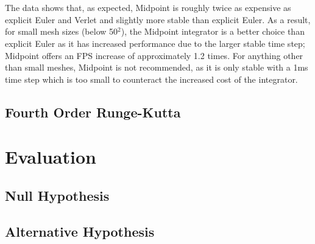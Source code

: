 \\\\The data shows that, as expected, Midpoint is roughly twice as expensive as explicit Euler and Verlet and slightly more stable than explicit Euler. As a result, for small mesh sizes (below 50$^{2}$), the Midpoint integrator is a better choice than explicit Euler as it has increased performance due to the larger stable time step; Midpoint offers an FPS increase of approximately 1.2 times. For anything other than small meshes, Midpoint is not recommended, as it is only stable with a 1ms time step which is too small to counteract the increased cost of the integrator.

\subsection{Fourth Order Runge-Kutta}


\section{Evaluation}

\subsection{Null Hypothesis}

\subsection{Alternative Hypothesis}

